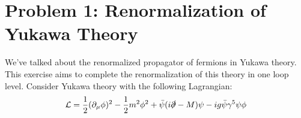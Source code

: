 \documentclass[11pt]{article}
\begin{document}
	
	
	\psetheader
	
	\section*{Problem 1: Renormalization of Yukawa Theory}
	
	\begin{problem}
		We've talked about the renormalized propagator of fermions in Yukawa theory. This exercise aims to complete the renormalization of this theory in one loop level. Consider Yukawa theory with the following Lagrangian:
		\[
		\mathcal{L} = \frac12 (\partial_\mu \phi)^2 - \frac12 m^2\phi^2 +\bar{\psi} (i\slashed{\partial}-M)\psi -ig\bar{\psi} \gamma^5 \psi \phi
		\]
		
	\end{problem}
\end{document}
